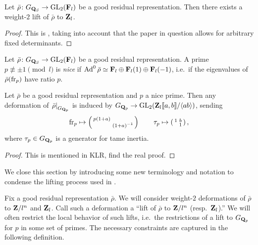 \begin{theorem}\label{thm:always-can-lift}
Let $\bar\rho\colon G_{\mathbf{Q}_S} \to \operatorname{GL}_2(\mathbf{F}_l)$ be a good residual 
representation. Then there exists a weight-$2$ lift of $\bar\rho$ to $\mathbf{Z}_l$. 
\end{theorem}
\begin{proof}
This is \cite[Th.~1]{ramakrishna-2002}, taking into account that the paper in 
question allows for arbitrary fixed determinants. 
\end{proof}

\begin{definition}
Let $\bar\rho\colon G_{\mathbf{Q}_S} \to \operatorname{GL}_2(\mathbf{F}_l)$ be a good residual 
representation. A prime $p\not\equiv \pm 1\pmod l$ is \emph{nice} if 
$\operatorname{Ad}^0\bar\rho\simeq \mathbf{F}_l \oplus \mathbf{F}_l(1)\oplus \mathbf{F}_l(-1)$, i.e.~if the 
eigenvalues of $\bar\rho(\mathrm{fr}_p)$ have ratio $p$. 
\end{definition}

\begin{theorem}
Let $\bar\rho$ be a good residual representation and $p$ a nice prime. Then 
any deformation of $\left.\bar\rho\right|_{G_{\mathbf{Q}_p}}$ is induced by 
$G_{\mathbf{Q}_p} \to \operatorname{GL}_2(\mathbf{Z}_l\llbracket a,b \rrbracket / \langle a b\rangle)$, sending 
\[
	\mathrm{fr}_p \mapsto \left(\begin{smallmatrix} p(1+a) &  \\  & (1+a)^{-1} \end{smallmatrix}\right) \qquad \tau_p \mapsto \left(\begin{smallmatrix} 1 & b \\  & 1 \end{smallmatrix}\right) ,
\]
where $\tau_p\in G_{\mathbf{Q}_p}$ is a generator for tame inertia. 
\end{theorem}
\begin{proof}
This is mentioned in KLR, find the real proof. 
\end{proof}

We close this section by introducing some new terminology and notation to 
condense the lifting process used in \cite{khare-larsen-ramakrishna-2005}. 

Fix a good residual representation $\bar\rho$. We will consider weight-$2$ 
deformations of $\bar\rho$ to $\mathbf{Z}/l^n$ and $\mathbf{Z}_l$. Call such a deformation a 
``lift of $\bar\rho$ to $\mathbf{Z}/l^n$ (resp.~$\mathbf{Z}_l$).'' We will often restrict the 
local behavior of such lifts, i.e.~the restrictions of a lift to $G_{\mathbf{Q}_p}$ 
for $p$ in some set of primes. The necessary constraints are captured in the 
following definition. 

